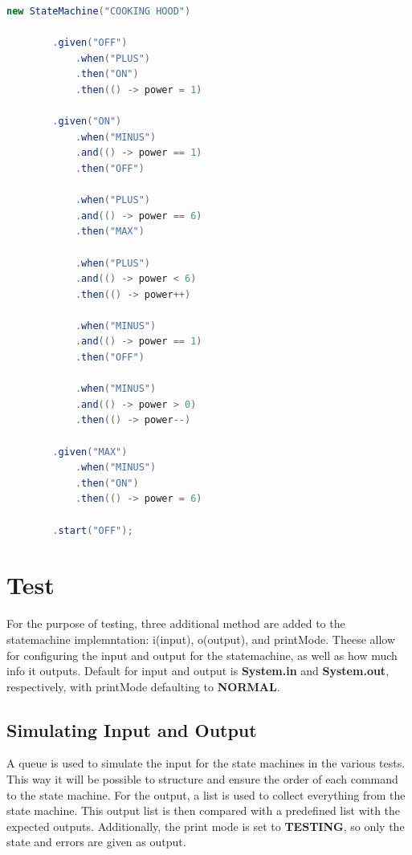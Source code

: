 \documentclass{article}
\begin{document}
\begin{lstlisting}[language=java, caption={Cooking Hood Implmentation}, captionpos=b]
    new StateMachine("COOKING HOOD")

        .given("OFF")
            .when("PLUS")
            .then("ON")
            .then(() -> power = 1)

        .given("ON")
            .when("MINUS")
            .and(() -> power == 1)
            .then("OFF")

            .when("PLUS")
            .and(() -> power == 6)
            .then("MAX")

            .when("PLUS")
            .and(() -> power < 6)
            .then(() -> power++)

            .when("MINUS")
            .and(() -> power == 1)
            .then("OFF")

            .when("MINUS")
            .and(() -> power > 0)
            .then(() -> power--)

        .given("MAX")
            .when("MINUS")
            .then("ON")
            .then(() -> power = 6)
        
        .start("OFF");
\end{lstlisting}

\section{Test}

For the purpose of testing, three additional method are added to the statemachine implemntation: i(input), o(output), and printMode. Theese allow for configuring the input and output for the statemachine, as well as how much info it outputs. Default for input and output is \textbf{System.in} and \textbf{System.out}, respectively, with printMode defaulting to \textbf{NORMAL}.

\subsection{Simulating Input and Output}

A queue is used to simulate the input for the state machines in the various tests. This way it will be possible to structure and ensure the order of each command to the state machine. For the output, a list is used to collect everything from the state machine. This output list is then compared with a predefined list with the expected outputs. Additionally, the print mode is set to \textbf{TESTING}, so only the state and errors are given as output.
\end{document}
